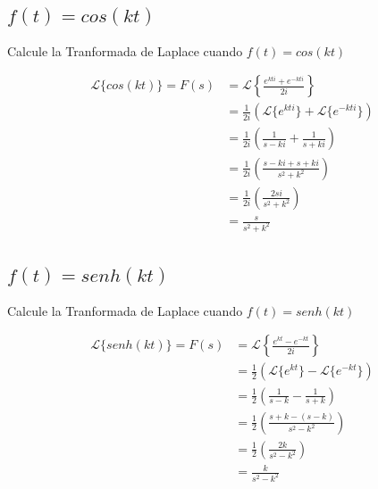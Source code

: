 \documentclass[12pt]{report}                                    %
\begin{document}
        \subsection{$f(t) = cos(kt)$}
            Calcule la Tranformada de Laplace cuando $f(t) = cos(kt)$

            \begin{equation*}   
            \begin{split}
                \mathscr{L}\{cos(kt)\}
                    = F(s) & = \mathscr{L}\left\{ \frac{e^{kti} + e^{-kti}}{2i} \right\}             \\
                    & = \frac{1}{2i} \left(\mathscr{L}\{e^{kti}\}+\mathscr{L}\{e^{-kti}\}\right)     \\
                    & = \frac{1}{2i} \left( \frac{1}{s-ki} + \frac{1}{s+ki} \right)                  \\
                    & = \frac{1}{2i} \left( \frac{s-ki+s+ki}{s^2+k^2} \right)                        \\
                    & = \frac{1}{2i} \left( \frac{2si}{s^2+k^2} \right)                              \\
                    & = \frac{s}{s^2+k^2}                                                            \\
            \end{split}
            \end{equation*}

        \clearpage
        \subsection{$f(t) = senh(kt)$}
            Calcule la Tranformada de Laplace cuando $f(t) = senh(kt)$

            \begin{equation*}   
            \begin{split}
                \mathscr{L}\{senh(kt)\}
                    = F(s) & = \mathscr{L}\left\{ \frac{e^{kt} - e^{-kt}}{2i} \right\}             \\
                    & = \frac{1}{2} \left(\mathscr{L}\{e^{kt}\}-\mathscr{L}\{e^{-kt}\}\right)      \\
                    & = \frac{1}{2} \left( \frac{1}{s-k} - \frac{1}{s+k} \right)                   \\
                    & = \frac{1}{2} \left( \frac{s+k-(s-k)}{s^2-k^2} \right)                       \\
                    & = \frac{1}{2} \left( \frac{2k}{s^2-k^2} \right)                              \\
                    & = \frac{k}{s^2-k^2}                                                          \\
            \end{split}
            \end{equation*}
\end{document}
